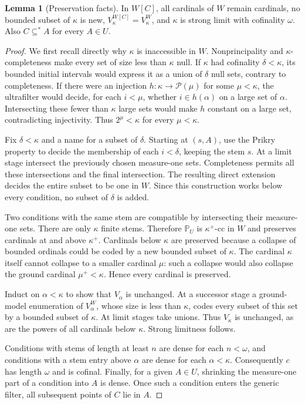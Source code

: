 \documentclass[11pt,letterpaper]{article}
\theoremstyle{definition}
\newtheorem{lemma}[definition]{Lemma}
\numberwithin{equation}{section}
\newcommand{\Pow}{\mathcal P}
\newcommand{\PP}{\mathbb P}
\begin{document}
\begin{lemma}[Preservation facts]\label{lem:preserve}
In $W[C]$, all cardinals of $W$ remain cardinals, no bounded subset of $\kappa$ is new, $V_\kappa^{W[C]}=V_\kappa^W$, and $\kappa$ is strong limit with cofinality $\omega$. Also $C\subseteq^* A$ for every $A\in U$.
\end{lemma}
\begin{proof}
We first recall directly why $\kappa$ is inaccessible in $W$. Nonprincipality and $\kappa$-completeness make every set of size less than $\kappa$ null. If $\kappa$ had cofinality $\delta<\kappa$, its bounded initial intervals would express it as a union of $\delta$ null sets, contrary to completeness. If there were an injection $h:\kappa\to\Pow(\mu)$ for some $\mu<\kappa$, the ultrafilter would decide, for each $i<\mu$, whether $i\in h(\alpha)$ on a large set of $\alpha$. Intersecting these fewer than $\kappa$ large sets would make $h$ constant on a large set, contradicting injectivity. Thus $2^\mu<\kappa$ for every $\mu<\kappa$.

Fix $\delta<\kappa$ and a name for a subset of $\delta$. Starting at $(s,A)$, use the Prikry property to decide the membership of each $i<\delta$, keeping the stem $s$. At a limit stage intersect the previously chosen measure-one sets. Completeness permits all these intersections and the final intersection. The resulting direct extension decides the entire subset to be one in $W$. Since this construction works below every condition, no subset of $\delta$ is added.

Two conditions with the same stem are compatible by intersecting their measure-one sets. There are only $\kappa$ finite stems. Therefore $\PP_U$ is $\kappa^+$-cc in $W$ and preserves cardinals at and above $\kappa^+$. Cardinals below $\kappa$ are preserved because a collapse of bounded ordinals could be coded by a new bounded subset of $\kappa$. The cardinal $\kappa$ itself cannot collapse to a smaller cardinal $\mu$: such a collapse would also collapse the ground cardinal $\mu^+<\kappa$. Hence every cardinal is preserved.

Induct on $\alpha<\kappa$ to show that $V_\alpha$ is unchanged. At a successor stage a ground-model enumeration of $V_\alpha^W$, whose size is less than $\kappa$, codes every subset of this set by a bounded subset of $\kappa$. At limit stages take unions. Thus $V_\kappa$ is unchanged, as are the powers of all cardinals below $\kappa$. Strong limitness follows.

Conditions with stems of length at least $n$ are dense for each $n<\omega$, and conditions with a stem entry above $\alpha$ are dense for each $\alpha<\kappa$. Consequently $c$ has length $\omega$ and is cofinal. Finally, for a given $A\in U$, shrinking the measure-one part of a condition into $A$ is dense. Once such a condition enters the generic filter, all subsequent points of $C$ lie in $A$.
\end{proof}
\end{document}
